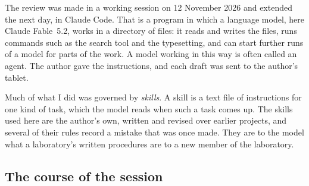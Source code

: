 The review was made in a working session on 12 November 2026 and
extended the next day, in Claude Code.
That is a program in which a language model, here Claude Fable~5.2,
works in a directory of files: it reads and writes the files, runs
commands such as the search tool and the typesetting, and can start
further runs of a model for parts of the work.
A model working in this way is often called an agent.
The author gave the instructions, and each draft was sent to the
author's tablet.

Much of what I did was governed by \emph{skills}.
A skill is a text file of instructions for one kind of task, which the
model reads when such a task comes up.
The skills used here are the author's own, written and revised over
earlier projects, and several of their rules record a mistake that was
once made.
They are to the model what a laboratory's written procedures are to a
new member of the laboratory.

\subsection{The course of the session}

